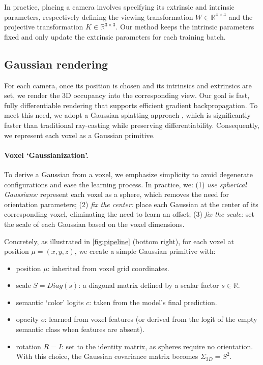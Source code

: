 In practice, placing a camera involves specifying its extrinsic and intrinsic parameters, respectively defining the viewing transformation \(W \in \mathbb{R}^{4 \times 4}\) and the projective transformation \(K \in \mathbb{R}^{3 \times 3}\).
{Our method keeps the intrinsic parameters fixed and only update the extrinsic parameters for each training batch.
}

\subsection{Gaussian rendering}
\label{sec:methods:gaussian_rendering}

For each camera, once its position is chosen and its intrinsics and extrinsics are set, we render the 3D occupancy into the corresponding view. Our goal is fast, fully differentiable rendering that supports efficient gradient backpropagation. To meet this need, we adopt a Gaussian splatting approach \cite{kerbl3Dgaussians}, which is significantly faster than traditional ray-casting while preserving differentiability.
Consequently, we represent each voxel as a Gaussian primitive.

\paragraph{Voxel `Gaussianization'.}
To derive a Gaussian from a voxel, we emphasize simplicity to avoid degenerate configurations and ease the learning process. In practice, we: (1) \textit{use spherical Gaussians:} represent each voxel as a sphere, which removes the need for orientation parameters; (2) \textit{fix the center:} place each Gaussian at the center of its corresponding voxel, eliminating the need to learn an offset; (3) \textit{fix the scale:} set the scale of each Gaussian based on the voxel dimensions.

Concretely, as illustrated in \autoref{fig:pipeline} (bottom right), for each voxel at position $\mu = (x,y,z)$, we create a simple Gaussian primitive with:  
\begin{itemize}
    \item position $\mu$: inherited from voxel grid coordinates.
    \item scale $S=\textit{Diag}(s)$: {a diagonal matrix defined by a scalar factor $s \in \mathbb{R}$.} %
    \item semantic `color' logits $c$: taken from the model's final prediction.
    \item opacity $o$: learned from voxel features (or derived from the logit of the empty semantic class when features are absent).
    \item rotation $R = I$: set to the identity matrix, as spheres require no orientation. With this choice, the Gaussian covariance matrix becomes $\Sigma_{3D}=S^2$.
\end{itemize}

